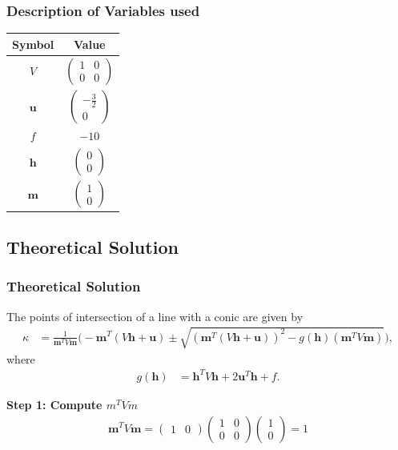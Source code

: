\documentclass{beamer}
\theoremstyle{remark}
\newcommand{\myvec}[1]{\ensuremath{\begin{pmatrix}#1\end{pmatrix}}}
\let\vec\mathbf
\numberwithin{equation}{section}
\begin{document}
\begin{frame}
\frametitle{Description of Variables used}

\begin{table}[H]
\centering
\begin{tabular}{|c|c|}
\hline
\textbf{Symbol} & \textbf{Value} \\
\hline
$V$ & $\myvec{1 & 0 \\ 0 & 0}$ \\
\hline
$\vec{u}$ & $\myvec{-\tfrac{3}{2} \\ 0}$ \\
\hline
$f$ & $-10$ \\
\hline
$\vec{h}$ & $\myvec{0 \\ 0}$ \\
\hline
$\vec{m}$ & $\myvec{1 \\ 0}$ \\
\hline
\end{tabular}
\end{table}

\end{frame}

\subsection{Theoretical Solution }
\begin{frame}
\frametitle{Theoretical Solution}
The points of intersection of a line with a conic are given by
\begin{align}
\kappa &= \frac{1}{\vec{m}^T V \vec{m}}
\Bigg(-\vec{m}^T(V\vec{h}+\vec{u}) 
\pm \sqrt{(\vec{m}^T(V\vec{h}+\vec{u}))^2 - g(\vec{h})(\vec{m}^T V \vec{m})}\Bigg),
\end{align}
where
\begin{align}
g(\vec{h}) &= \vec{h}^T V \vec{h} + 2\vec{u}^T \vec{h} + f.
\end{align}

\noindent\textbf{Step 1: Compute $m^T V m$}  
\begin{align}
\vec{m}^T V \vec{m} = \myvec{1 & 0}\myvec{1 & 0 \\ 0 & 0}\myvec{1 \\ 0} = 1
\end{align}

\end{frame}
\end{document}
